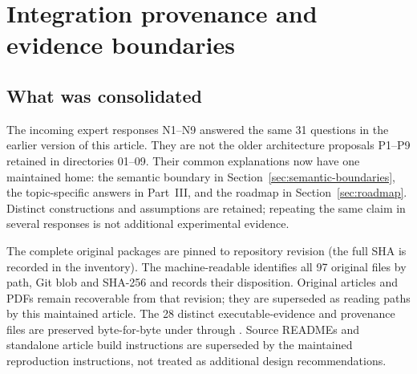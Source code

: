\section{Integration provenance and evidence boundaries}\label{sec:integration}

\subsection{What was consolidated}

The incoming expert responses N1--N9 answered the same 31 questions in the
earlier version of this article. They are not the older architecture proposals
P1--P9 retained in directories 01--09. Their common explanations now have one
maintained home: the semantic boundary in
Section~\ref{sec:semantic-boundaries}, the topic-specific answers in Part~III,
and the roadmap in Section~\ref{sec:roadmap}. Distinct constructions and
assumptions are retained; repeating the same claim in several responses is
not additional experimental evidence.

The complete original packages are pinned to repository revision
 (the full SHA is recorded in the inventory). The machine-readable
 identifies all 97 original files by path,
Git blob and SHA-256 and records their disposition. Original articles and PDFs
remain recoverable from that revision; they are superseded as reading paths
by this maintained article. The 28 distinct executable-evidence and provenance
files are preserved byte-for-byte under  through
. Source READMEs and standalone article build instructions
are superseded by the maintained reproduction instructions, not treated as
additional design recommendations.

